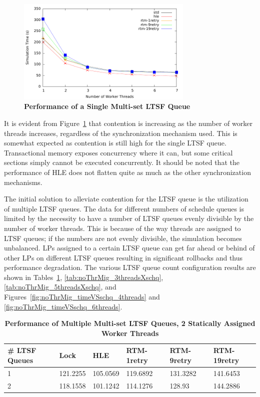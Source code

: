\documentclass[11pt]{book}
\begin{document}
\begin{figure}
    \centering
    \graphicspath{ {./figures/} }
    \includegraphics[width=0.75\textwidth,keepaspectratio]{hugeepidemicsim-NOmig-timeVSthreads-multiset-1schQ}
    \caption{\textbf{Performance of a Single Multi-set LTSF Queue}}
    \label{fig:noThrMig_timeVSthreads_1schq}
\end{figure}

It is evident from Figure~\ref{fig:noThrMig_timeVSthreads_1schq} that contention is
increasing as the number of worker threads increases, regardless of the synchronization
mechanism used.  This is somewhat expected as contention is still high for the single LTSF
queue.  Transactional memory exposes concurrency where it can, but some critical sections
simply cannot be executed concurrently.  It should be noted that the performance of HLE
does not flatten quite as much as the other synchronization mechanisms.

The initial solution to alleviate contention for the LTSF queue is the utilization of
multiple LTSF queues.  The data for different numbers of schedule queues is limited by the
necessity to have a number of LTSF queues evenly divisible by the number of worker threads.
This is because of the way threads are assigned to LTSF queues; if the numbers are not
evenly divisible, the simulation becomes unbalanced.  LPs assigned to a certain LTSF queue
can get far ahead or behind of other LPs on different LTSF queues resulting in significant rollbacks
and thus performance degradation.  The various LTSF queue count configuration results are
shown in Tables~\ref{tab:noThrMig_2threadsXschq}, \ref{tab:noThrMig_3threadsXschq},
\ref{tab:noThrMig_5threadsXschq}, and Figures~\ref{fig:noThrMig_timeVSschq_4threads} and
\ref{fig:noThrMig_timeVSschq_6threads}.

\begin{table}
    \centering
    \begin{tabular}{l|p{2cm}|p{2cm}|p{2cm}|p{2cm}|p{2cm}}
        \textbf{\# LTSF Queues}&Lock &HLE &RTM-1retry &RTM-9retry &RTM-19retry \\
        \hline
        \midrule
            1 &121.2255  &105.0569 &119.6892 &131.3282 &141.6453 \\ 
            2 &118.1558  &101.1242 &114.1276 &128.93   &144.2886 \\
    \end{tabular}
    \caption{\textbf{Performance of Multiple Multi-set LTSF Queues, 2 Statically Assigned Worker Threads}}
    \label{tab:noThrMig_2threadsXschq}
\end{table}
\end{document}
